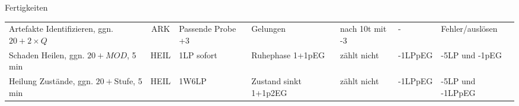 \documentclass[a4paper, 11pt]{article}
\begin{document}
\begin{multicols}{2}
\begin{spmbox}{Fertigkeiten}
\begin{tabularx}{\linewidth}{X c l l l l l }
                Artefakte Identifizieren, ggn. $20+2\times Q$ & ARK & Passende Probe +3 & Gelungen & nach 10t mit -3 & - & Fehler/auslösen\\
                Schaden Heilen, ggn. $20+MOD$, 5 min & HEIL &  1LP sofort & Ruhephase 1+1pEG & zählt nicht & -1LPpEG & -5LP und -1pEG\\
                Heilung Zustände, ggn. $20+$Stufe, 5 min & HEIL & 1W6LP & Zustand sinkt 1+1p2EG & zählt nicht & -1LPpEG & -5LP und -1LPpEG \\
        \end{tabularx}
\end{spmbox}
\end{multicols}
\end{document}
